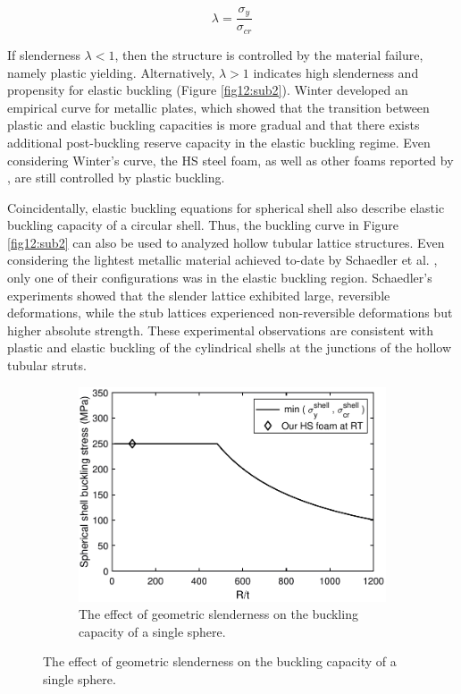 \documentclass[review]{elsarticle}
\begin{document}
{\begin{equation}\label{Eq5}
\lambda=\frac{\sigma_y}{\sigma_{cr}}
\end{equation}

If slenderness $\lambda<1$, then the structure is controlled by the material failure, namely plastic yielding. Alternatively, $\lambda>1$ indicates high slenderness and propensity for elastic buckling (Figure \ref{fig12:sub2}). Winter \cite{Winter1947} developed an empirical curve for metallic plates, which showed that the transition between plastic and elastic buckling capacities is more gradual and that there exists additional post-buckling reserve capacity in the elastic buckling regime. Even considering Winter’s curve, the HS steel foam, as well as other foams reported by \cite{Fallet2008}, are still controlled by plastic buckling.

Coincidentally, elastic buckling equations for spherical shell also describe elastic buckling capacity of a circular shell. Thus, the buckling curve in Figure \ref{fig12:sub2} can also be used to analyzed hollow tubular lattice structures. Even considering the lightest metallic material achieved to-date by Schaedler et al. \cite{Sch2011}, only one of their configurations was in the elastic buckling region. Schaedler’s experiments showed that the slender lattice exhibited large, reversible deformations, while the stub lattices experienced non-reversible deformations but higher absolute strength. These experimental observations are consistent with plastic and elastic buckling of the cylindrical shells at the junctions of the hollow tubular struts.

\begin{figure}[htp]
	\centering
	\begin{subfigure}{0.95\textwidth}
		\centering
		\includegraphics[width=0.65\linewidth]
		{Tex-Figures/Fig12a_Buckling_b_t.pdf}
		\caption{The effect of geometric slenderness on the buckling capacity of a single sphere.}
		\label{fig12:sub1}
	\end{subfigure}


\end{figure}}
\end{document}
